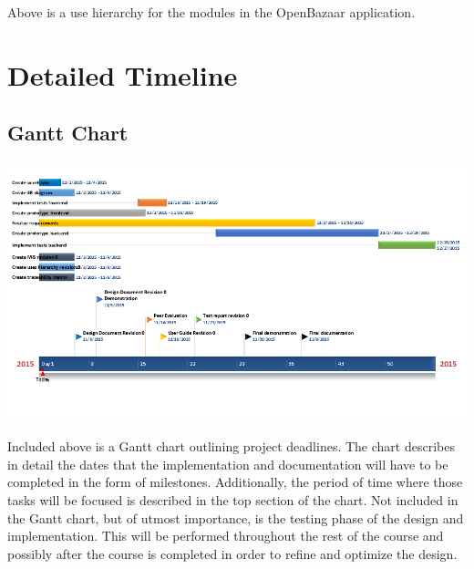 \documentclass{article}
\begin{document}
Above is a use hierarchy for the modules in the OpenBazaar application.
\section*{Detailed Timeline}

\subsection*{Gantt Chart}
\includegraphics[scale=0.5]{gantt_chart}

Included above is a Gantt chart outlining project deadlines. The chart describes in detail the dates that the implementation and documentation will have to be completed in the form of milestones. Additionally, the period of time where those tasks will be focused is described in the top section of the chart. Not included in the Gantt chart, but of utmost importance, is the testing phase of the design and implementation. This will be performed throughout the rest of the course and possibly after the course is completed in order to refine and optimize the design.
\end{document}
